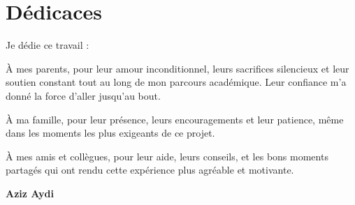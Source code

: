 \chapter*{\Large \center Dédicaces}

Je dédie ce travail :

\vspace{1em}

\noindent
À mes parents, pour leur amour inconditionnel, leurs sacrifices silencieux et leur soutien constant tout au long de mon parcours académique. Leur confiance m’a donné la force d’aller jusqu’au bout.

\vspace{1em}

\noindent
À ma famille, pour leur présence, leurs encouragements et leur patience, même dans les moments les plus exigeants de ce projet.

\vspace{1em}

\noindent
À mes amis et collègues, pour leur aide, leurs conseils, et les bons moments partagés qui ont rendu cette expérience plus agréable et motivante.

\vspace{2em}


\hfill\textbf {Aziz Aydi}\\
